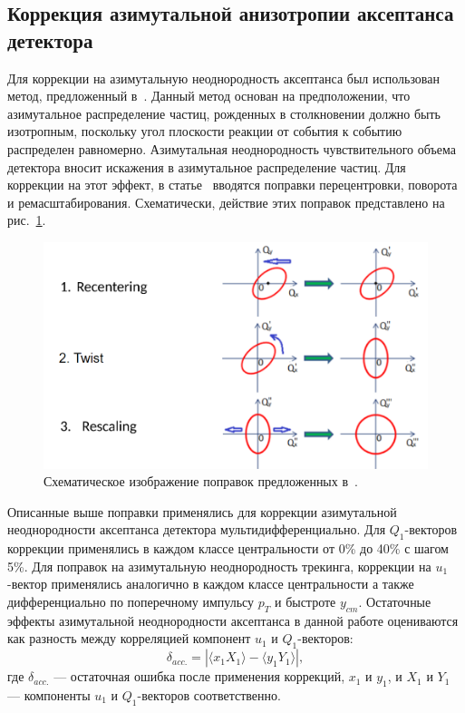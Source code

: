 \subsection{Коррекция азимутальной анизотропии аксептанса детектора}

Для коррекции на азимутальную неоднородность аксептанса был использован метод, предложенный в~\cite{Selyuzhenkov:2007zi}.
Данный метод основан на предположении, что азимутальное распределение частиц, рожденных в столкновении должно быть изотропным, поскольку угол плоскости реакции от события к событию распределен равномерно.
Азимутальная неоднородность чувствительного объема детектора вносит искажения в азимутальное распределение частиц. 
Для коррекции на этот эффект, в статье~\cite{Selyuzhenkov:2007zi} вводятся поправки перецентровки, поворота и ремасштабирования. 
Схематически, действие этих поправок представлено на рис.~\ref{fig:qn_corrections}.
%
\begin{figure}[ht]
\begin{center}
\includegraphics[width=0.75\linewidth]{images/qntools_corrections.png}
\caption{Схематическое изображение поправок предложенных в~\cite{Selyuzhenkov:2007zi}.}
\label{fig:qn_corrections}
\end{center}
\end{figure}
%

Описанные выше поправки применялись для коррекции азимутальной неоднородности аксептанса детектора мультидифференциально.
Для $Q_1$-векторов коррекции применялись в каждом классе центральности от 0\% до 40\% с шагом 5\%.
Для поправок на азимутальную неоднородность трекинга, коррекции на $u_1$-вектор применялись аналогично в каждом классе центральности а также дифференциально по поперечному импульсу $p_T$ и быстроте $y_{cm}$. 
Остаточные эффекты азимутальной неоднородности аксептанса в данной работе оцениваются как разность между корреляцией компонент $u_1$ и $Q_1$-векторов:
\begin{equation}
    \delta_{acc.} = | \langle x_1 X_1 \rangle - \langle y_1 Y_1 \rangle |,
\end{equation}
где $\delta_{acc.}$ --- остаточная ошибка после применения коррекций, $x_1$ и $y_1$, и $X_1$ и $Y_1$ --- компоненты $u_1$ и $Q_1$-векторов соответственно. 

